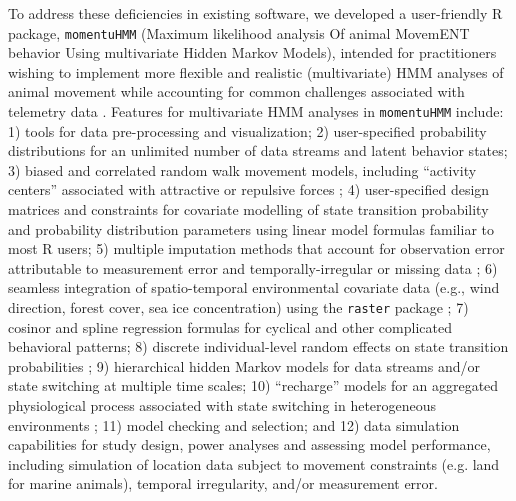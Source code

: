 \documentclass[12pt]{article}\usepackage[]{graphicx}\usepackage[]{xcolor}
\begin{document}
To address these deficiencies in existing software, we developed a user-friendly R package, \verb|momentuHMM| (Maximum likelihood analysis Of animal MovemENT behavior Using multivariate Hidden Markov Models), intended for practitioners wishing to implement more flexible and realistic (multivariate) HMM analyses of animal movement while accounting for common challenges associated with telemetry data \citep{McClintockMichelot2018}. Features for multivariate HMM analyses in \verb|momentuHMM| include: 1) tools for data pre-processing and visualization; 2) user-specified probability distributions for an unlimited number of data streams and latent behavior states; 3) biased and correlated random walk movement models, including ``activity centers'' associated with attractive or repulsive forces \citep[e.g.][]{McClintockEtAl2012}; 4) user-specified design matrices and constraints for covariate modelling of state transition probability and probability distribution parameters using linear model formulas familiar to most R users; 5) multiple imputation methods that account for observation error attributable to measurement error and temporally-irregular or missing data \citep{HootenEtAl2017,McClintock2017}; 6) seamless integration of spatio-temporal environmental covariate data (e.g., wind direction, forest cover, sea ice concentration) using the \verb|raster| package \citep{Hijmans2016}; 7) cosinor \citep[e.g.][]{Cornelissen2014} and spline regression formulas for cyclical and other complicated behavioral patterns; 8) discrete individual-level random effects on state transition probabilities \citep[e.g.][]{DeRuiterEtAl2017}; 9) hierarchical hidden Markov models \citep[e.g.][]{Leos-BarajasEtAl2017,AdamEtAl2019} for data streams and/or state switching at multiple time scales; 10) ``recharge'' models for an aggregated physiological process associated with state switching in heterogeneous environments \citep{HootenEtAl2019}; 11) model checking and selection; and 12) data simulation capabilities for study design, power analyses and assessing model performance, including simulation of location data subject to movement constraints (e.g. land for marine animals), temporal irregularity, and/or measurement error. 
\end{document}
